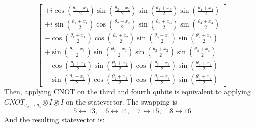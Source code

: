 \documentclass[12pt]{article}
\numberwithin{equation}{section}  %
\theoremstyle{definition}
\theoremstyle{plain}
\theoremstyle{remark}
\begin{document}
\begin{equation}
\begin{bmatrix}
+i\cos\left(\frac{\theta_1+x_1}{2}\right)
\sin\left(\frac{\theta_2+x_2}{2}\right)
\sin\left(\frac{\theta_3+x_3}{2}\right)
\sin\left(\frac{\theta_4+x_4}{2}\right)
\\[6pt]

+i\sin\left(\frac{\theta_1+x_1}{2}\right)
\cos\left(\frac{\theta_2+x_2}{2}\right)
\sin\left(\frac{\theta_3+x_3}{2}\right)
\sin\left(\frac{\theta_4+x_4}{2}\right)
\\[6pt]

-\cos\left(\frac{\theta_1+x_1}{2}\right)
\cos\left(\frac{\theta_2+x_2}{2}\right)
\sin\left(\frac{\theta_3+x_3}{2}\right)
\sin\left(\frac{\theta_4+x_4}{2}\right)
\\[6pt]

+\sin\left(\frac{\theta_1+x_1}{2}\right)
\sin\left(\frac{\theta_2+x_2}{2}\right)
\sin\left(\frac{\theta_3+x_3}{2}\right)
\sin\left(\frac{\theta_4+x_4}{2}\right)
\\[6pt]

-\cos\left(\frac{\theta_1+x_1}{2}\right)
\sin\left(\frac{\theta_2+x_2}{2}\right)
\cos\left(\frac{\theta_3+x_3}{2}\right)
\sin\left(\frac{\theta_4+x_4}{2}\right)
\\[6pt]

-\sin\left(\frac{\theta_1+x_1}{2}\right)
\cos\left(\frac{\theta_2+x_2}{2}\right)
\cos\left(\frac{\theta_3+x_3}{2}\right)
\sin\left(\frac{\theta_4+x_4}{2}\right)
\end{bmatrix}
\end{equation}
Then, applying CNOT on the third and fourth qubits is equivalent to applying $CNOT_{q_2\rightarrow q_3}\otimes I\otimes I$ on the statevector. The swapping is
\begin{equation*}
    5\leftrightarrow 13,\quad 6\leftrightarrow14,\quad 7\leftrightarrow15,\quad 8\leftrightarrow16
\end{equation*}
And the resulting statevector is:
\end{document}

